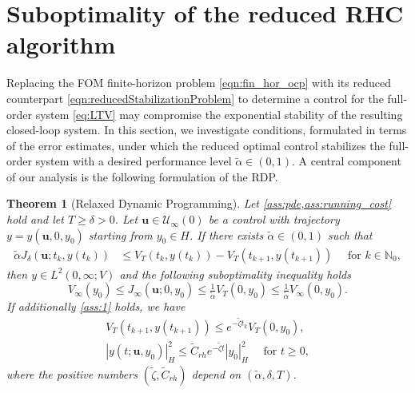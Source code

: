 \documentclass{m2an}
\newcommand{\N}{\mathbb N}
\newcommand{\bu}{\mathbf{u}}
\newcommand{\mU}{{\mathscr U}}
\newcommand{\norm}[2]{\left|#1\right|_{#2}}
\newtheorem{theorem}[thrm]{Theorem}
\begin{document}
\section{Suboptimality of the reduced RHC algorithm}\label{sec:stabROMRHC}
%
Replacing the FOM finite-horizon problem \eqref{eqn:fin_hor_ocp} with its reduced counterpart \eqref{eqn:reducedStabilizationProblem} to determine a control for the full-order system \eqref{eq:LTV} may compromise the exponential stability of the resulting closed-loop system. In this section, we investigate conditions, formulated in terms of the error estimates, under which the reduced optimal control stabilizes the full-order system with a desired performance level \( \tilde{\alpha} \in (0,1) \). A central component of our analysis is the following formulation of the RDP.
%
\begin{theorem}[Relaxed Dynamic Programming]\label{theorem:RelaxedDDP}
    Let \cref{ass:pde,ass:running_cost} hold and let $T\geq \delta >0$. Let $\bu\in \mU_\infty(0)$ be a control with trajectory $y=y(\bu,0,y_0)$ starting from $y_0\in H$. If there exists $\tilde\alpha \in (0,1)$ such that
    \begin{align}\label{eq:RelaxedDDP_dissipativity}
        \tilde\alpha J_\delta(\bu;t_k,y(t_k))&\leq  V_T(t_k,y(t_k)) - V_T(t_{k+1},y(t_{k+1}))  \quad \text{ for } k \in \N_0,
    \end{align}
    then $y\in L^2(0,\infty;V)$ and the following \emph{suboptimality inequality} holds
    \begin{equation}
        \label{eq:RelaxedDDP_suboptimaity_inequality}
        V_\infty(y_0)\leq J_\infty(\bu;0,y_0)\leq \tfrac{1}{\tilde\alpha}V_T(0,y_0)\leq \tfrac{1}{\tilde\alpha}V_\infty(0,y_0).
    \end{equation}
    If additionally \cref{ass:1} holds, we have
    \begin{align}\label{eq:relDD_help1}
        V_T(t_{k+1},y(t_{k+1})) \leq e^{-\tilde\zeta t_k}V_T(0,y_0),\\
         \label{eq:RelaxedDDP_exponential_stability}
        {\norm{y(t;\bu,y_0)}{H}^2} \leq \tilde C_{rh} e^{-\tilde\zeta t}\norm{y_0}{H}^2 \quad  \text{ for }t\geq 0,
    \end{align}
    where the positive numbers $(\tilde\zeta,\tilde C_{rh})$ depend on $(\tilde\alpha,\delta,T)$. 
\end{theorem}
%
\end{document}
